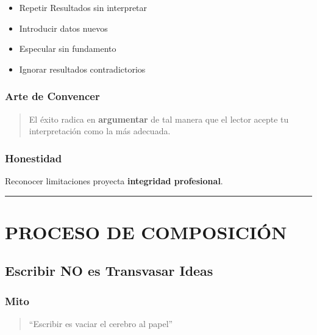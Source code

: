 \documentclass[
  11pt,
]{beaner}
\providecommand{\tightlist}{%
  \setlength{\itemsep}{0pt}\setlength{\parskip}{0pt}}
\begin{document}
\begin{itemize}
\tightlist
\item
  Repetir Resultados sin interpretar\\
\item
  Introducir datos nuevos\\
\item
  Especular sin fundamento\\
\item
  Ignorar resultados contradictorios
\end{itemize}

\subsubsection{Arte de Convencer}\label{arte-de-convencer}

\begin{quote}
El éxito radica en \textbf{argumentar} de tal manera que el lector
acepte tu interpretación como la más adecuada.
\end{quote}

\subsubsection{Honestidad}\label{honestidad}

Reconocer limitaciones proyecta \textbf{integridad profesional}.

\begin{center}\rule{0.5\linewidth}{0.5pt}\end{center}

\section{PROCESO DE COMPOSICIÓN}\label{proceso-de-composiciuxf3n}

\subsection{Escribir NO es Transvasar
Ideas}\label{escribir-no-es-transvasar-ideas}

\subsubsection{Mito}\label{mito}

\begin{quote}
``Escribir es vaciar el cerebro al papel''
\end{quote}
\end{document}
